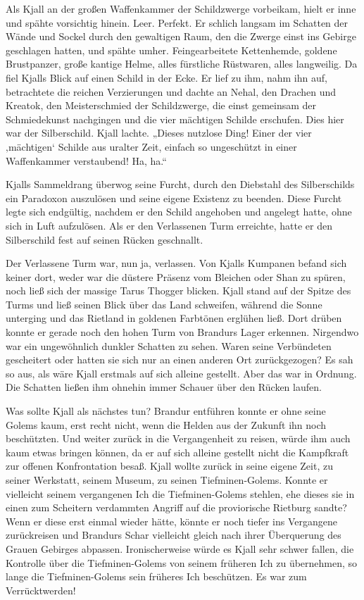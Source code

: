 Als Kjall an der großen Waffenkammer der Schildzwerge vorbeikam, hielt er inne und spähte vorsichtig hinein. Leer. Perfekt. Er schlich langsam im Schatten der Wände und Sockel durch den gewaltigen Raum, den die Zwerge einst ins Gebirge geschlagen hatten, und spähte umher. Feingearbeitete Kettenhemde, goldene Brustpanzer, große kantige Helme, alles fürstliche Rüstwaren, alles langweilig. Da fiel Kjalls Blick auf einen Schild in der Ecke. Er lief zu ihm, nahm ihn auf, betrachtete die reichen Verzierungen und dachte an Nehal, den Drachen und Kreatok, den Meisterschmied der Schildzwerge, die einst gemeinsam der Schmiedekunst nachgingen und die vier mächtigen Schilde erschufen. Dies hier war der Silberschild. Kjall lachte. „Dieses nutzlose Ding! Einer der vier ‚mächtigen‘ Schilde aus uralter Zeit, einfach so ungeschützt in einer Waffenkammer verstaubend! Ha, ha.“

Kjalls Sammeldrang überwog seine Furcht, durch den Diebstahl des Silberschilds ein Paradoxon auszulösen und seine eigene Existenz zu beenden. Diese Furcht legte sich endgültig, nachdem er den Schild angehoben und angelegt hatte, ohne sich in Luft aufzulösen. Als er den Verlassenen Turm erreichte, hatte er den Silberschild fest auf seinen Rücken geschnallt.\bigskip



Der Verlassene Turm war, nun ja, verlassen. Von Kjalls Kumpanen befand sich keiner dort, weder war die düstere Präsenz vom Bleichen oder Shan zu spüren, noch ließ sich der massige Tarus Thogger blicken. Kjall stand auf der Spitze des Turms und ließ seinen Blick über das Land schweifen, während die Sonne unterging und das Rietland in goldenen Farbtönen erglühen ließ. Dort drüben konnte er gerade noch den hohen Turm von Brandurs Lager erkennen. Nirgendwo war ein ungewöhnlich dunkler Schatten zu sehen. Waren seine Verbündeten gescheitert oder hatten sie sich nur an einen anderen Ort zurückgezogen? Es sah so aus, als wäre Kjall erstmals auf sich alleine gestellt. Aber das war in Ordnung. Die Schatten ließen ihm ohnehin immer Schauer über den Rücken laufen.

Was sollte Kjall als nächstes tun? Brandur entführen konnte er ohne seine Golems kaum, erst recht nicht, wenn die Helden aus der Zukunft ihn noch beschützten. Und weiter zurück in die Vergangenheit zu reisen, würde ihm auch kaum etwas bringen können, da er auf sich alleine gestellt nicht die Kampfkraft zur offenen Konfrontation besaß. Kjall wollte zurück in seine eigene Zeit, zu seiner Werkstatt, seinem Museum, zu seinen Tiefminen-Golems. Konnte er vielleicht seinem vergangenen Ich die Tiefminen-Golems stehlen, ehe dieses sie in einen zum Scheitern verdammten Angriff auf die proviorische Rietburg sandte? Wenn er diese erst einmal wieder hätte, könnte er noch tiefer ins Vergangene zurückreisen und Brandurs Schar vielleicht gleich nach ihrer Überquerung des Grauen Gebirges abpassen. Ironischerweise würde es Kjall sehr schwer fallen, die Kontrolle über die Tiefminen-Golems von seinem früheren Ich zu übernehmen, so lange die Tiefminen-Golems sein früheres Ich beschützen. Es war zum Verrücktwerden!

